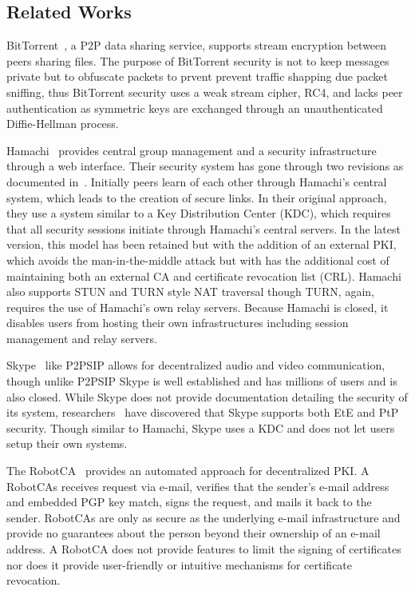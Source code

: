 \documentclass[conference]{IEEEtran}
\begin{document}
\subsection{Related Works}
BitTorrent~\cite{bittorrent_security}, a P2P data sharing service,  supports
stream encryption between peers sharing files.  The purpose of BitTorrent
security is not to keep messages private but to obfuscate packets to prvent
prevent traffic shapping due packet sniffing, thus BitTorrent security uses a
weak stream cipher, RC4, and lacks peer authentication as symmetric keys are
exchanged through an unauthenticated Diffie-Hellman process.

Hamachi~\cite{hamachi} provides central group management and a security
infrastructure through a web interface.  Their security system has gone through
two revisions as documented in~\cite{hamachi_security}.  Initially peers learn
of each other through Hamachi's central system, which leads to the creation of
secure links.  In their original approach, they use a system similar to a Key
Distribution Center (KDC), which requires that all security sessions initiate
through Hamachi's central servers.  In the latest version, this model has been
retained but with the addition of an external PKI, which avoids the
man-in-the-middle attack but with has the additional cost of maintaining both
an external CA and certificate revocation list (CRL).  Hamachi also supports
STUN and TURN style NAT traversal though TURN, again, requires the use of
Hamachi's own relay servers.  Because Hamachi is closed, it disables users from
hosting their own infrastructures including session management and relay
servers.

Skype~\cite{skype} like P2PSIP allows for decentralized audio and video
communication, though unlike P2PSIP Skype is well established and has millions
of users and is also closed.  While Skype does not provide documentation
detailing the security of its system, researchers~\cite{skype_auth,
skype_overview} have discovered that Skype supports both EtE and PtP security.
Though similar to Hamachi, Skype uses a KDC and does not let users setup their
own systems.

The RobotCA~\cite{robotca} provides an automated approach for decentralized
PKI.  A RobotCAs receives request via e-mail, verifies that the sender's e-mail
address and embedded PGP key match, signs the request, and mails it back to the
sender.  RobotCAs are only as secure as the underlying e-mail infrastructure
and provide no guarantees about the person beyond their ownership of an e-mail
address.  A RobotCA does not provide features to limit the signing of
certificates nor does it provide user-friendly or intuitive mechanisms for
certificate revocation.
\end{document}
